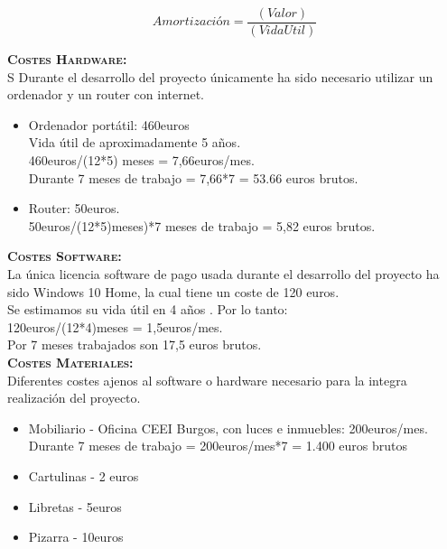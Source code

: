 \begin{equation}
Amortización = \frac{(Valor)}{(VidaUtil)}
\end{equation}

\textbf{\textsc{Costes Hardware:}}\\S
Durante el desarrollo del proyecto únicamente ha sido necesario utilizar un ordenador y un router con internet.
\begin{itemize}
\item Ordenador portátil: 460euros \\Vida útil de aproximadamente 5 años.\\460euros/(12*5) meses = 7,66euros/mes.\\Durante 7 meses de trabajo = 7,66*7 = 53.66 euros brutos.
\item Router: 50euros. \\ 50euros/(12*5)meses)*7 meses de trabajo = 5,82 euros brutos.
\end{itemize}


\textbf{\textsc{Costes Software:}}\\
La única licencia software de pago usada durante el desarrollo del proyecto ha sido Windows 10 Home, la cual tiene un coste de 120 euros.\\
Se estimamos su vida útil en 4 años \cite{vidautil}. Por lo tanto:\\
120euros/(12*4)meses = 1,5euros/mes.\\
Por 7 meses trabajados son 17,5 euros brutos.\\

\textbf{\textsc{Costes Materiales:}}\\
Diferentes costes ajenos al software o hardware necesario para la integra realización del proyecto.
\begin{itemize}
\item Mobiliario - Oficina CEEI Burgos, con luces e inmuebles: 200euros/mes.\\
Durante 7 meses de trabajo = 200euros/mes*7 = 1.400 euros brutos\\
\item Cartulinas - 2 euros
\item Libretas - 5euros
\item Pizarra - 10euros
\end{itemize}

